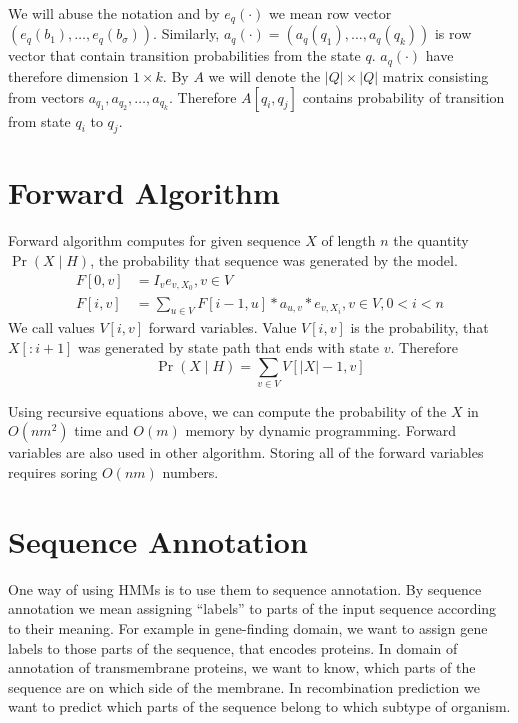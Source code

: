 We will abuse the notation and by $e_q(\cdot)$ we mean row vector
$\left(e_q(b_1),\dots,e_q(b_{\sigma})\right)$. Similarly,
$a_q(\cdot)=\left(a_q(q_1),\dots,a_q(q_k)\right)$ is row vector that contain
transition probabilities from the state $q$.  $a_q(\cdot)$ have therefore
dimension $1\times k$. By $A$ we will denote the $|Q|\times |Q|$ matrix
consisting from vectors $a_{q_1},a_{q_2},\dots,a_{q_k}$.  Therefore $A[q_i,q_j]$
contains probability of transition from state $q_i$ to $q_j$.

\section{Forward Algorithm}
Forward algorithm computes for given sequence $X$ of length $n$ the quantity $\Pr\left(X\mid
H\right)$, the probability that sequence
was generated by the model. 
\begin{align}
F[0,v] &= I_ve_{v,X_0}, v\in V\\
F[i,v] &= \sum_{u\in V}F[i-1,u]*a_{u,v}*e_{v,X_i}, v\in V,0< i < n
\end{align}
We call values $V[i,v]$ forward variables. Value $V[i,v]$ is the
probability, that $X[:i+1]$ was generated by state path that ends with state
$v$. Therefore \[\Pr\left(X\mid H\right) = \sum_{v\in V} V[|X|-1,v]\]

Using recursive equations above, we can compute the probability of the $X$ in
$O(nm^2)$ time and $O(m)$ memory by dynamic programming. Forward variables are
also used in other algorithm. Storing all of the forward variables requires
soring $O(nm)$ numbers.

\section{Sequence Annotation}


One way of using HMMs is to use them to sequence annotation. By sequence
annotation we mean assigning ``labels'' to parts of the input sequence according
to their meaning. For example in gene-finding domain, we want to assign gene
labels to those parts of the sequence, that encodes proteins. In domain of
annotation of transmembrane proteins, we want to know, which parts of the
sequence are on which  side of the membrane. In recombination prediction we want
to predict which parts of the sequence belong to which subtype of organism.

